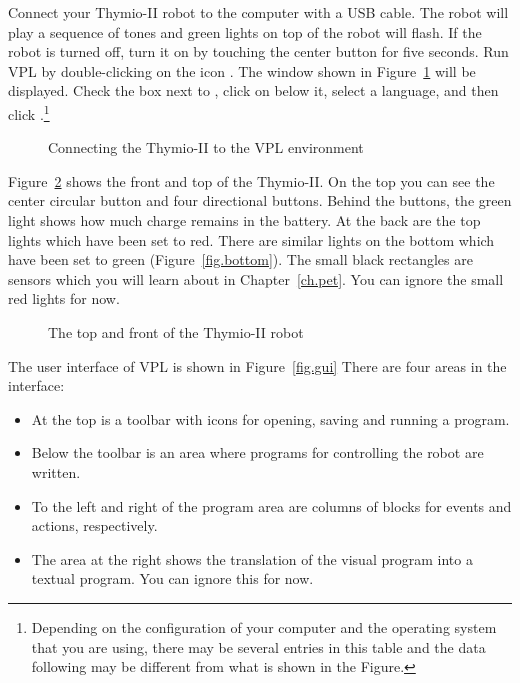 

Connect your Thymio-II robot to the computer with a USB cable. The robot
will play a sequence of tones and green lights on top of the robot will
flash. If the robot is turned off, turn it on by touching the center
button for five seconds. Run VPL by double-clicking on the icon
. The window shown in Figure~\ref{fig.connect} will be
displayed. Check the box next to , click on  below it, select a language, and then click
.\footnote{Depending on the configuration of your computer
and the operating system that you are using, there may be several
entries in this table and the data following  may be
different from what is shown in the Figure.}

\begin{figure}
\begin{center}
\caption{Connecting the Thymio-II to the VPL environment}\label{fig.connect}
\end{center}
\end{figure} 


Figure~\ref{fig.front} shows the front and top of the Thymio-II. On the
top you can see the center circular button and four directional buttons.
Behind the buttons, the green light shows how much charge remains in the
battery. At the back are the top lights which have been set to red.
There are similar lights on the bottom which have been set to green
(Figure~\ref{fig.bottom}). The small black rectangles are sensors which
you will learn about in Chapter~\ref{ch.pet}. You can ignore the small
red lights for now.

\begin{figure}
\begin{center}
\caption{The top and front of the Thymio-II robot}\label{fig.front}
\end{center}
\end{figure} 

\clearpage


The user interface of VPL is shown in Figure~\ref{fig.gui}
There are four areas in the interface:

\begin{itemize}
\item At the top is a toolbar with icons for opening, saving and running
a program. 
\item Below the toolbar is an area where programs for controlling
the robot are written.
\item To the left and right of the program area are columns of blocks
for events and actions, respectively.
\item The area at the right shows the translation of the visual
program into a textual program. You can ignore this for now.
\end{itemize}


